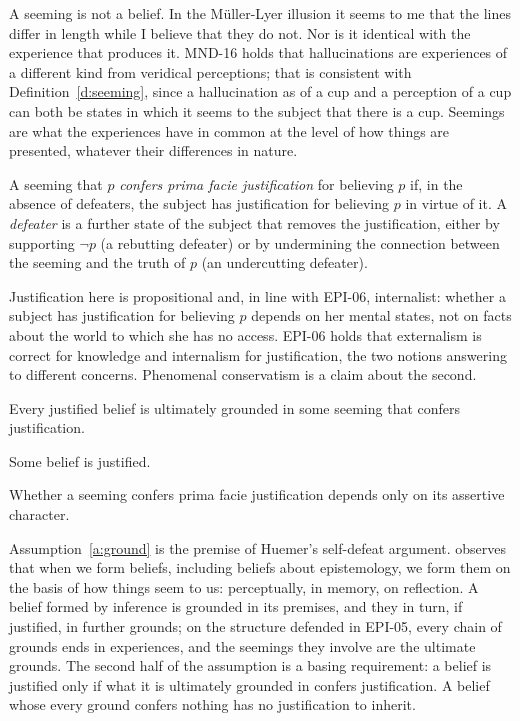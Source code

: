 \documentclass{situationist-preprint}
\begin{document}
A seeming is not a belief. In the Müller-Lyer illusion it seems to me that the lines differ in length while I believe that they do not. Nor is it identical with the experience that produces it. MND-16 holds that hallucinations are experiences of a different kind from veridical perceptions; that is consistent with Definition~\ref{d:seeming}, since a hallucination as of a cup and a perception of a cup can both be states in which it seems to the subject that there is a cup. Seemings are what the experiences have in common at the level of how things are presented, whatever their differences in nature.

\begin{definition}\label{d:pf}
A seeming that $p$ \emph{confers prima facie justification} for believing $p$ if, in the absence of defeaters, the subject has justification for believing $p$ in virtue of it. A \emph{defeater} is a further state of the subject that removes the justification, either by supporting $\neg p$ (a rebutting defeater) or by undermining the connection between the seeming and the truth of $p$ (an undercutting defeater).
\end{definition}

Justification here is propositional and, in line with EPI-06, internalist: whether a subject has justification for believing $p$ depends on her mental states, not on facts about the world to which she has no access. EPI-06 holds that externalism is correct for knowledge and internalism for justification, the two notions answering to different concerns. Phenomenal conservatism is a claim about the second.

\begin{assumption}[Grounding]\label{a:ground}
Every justified belief is ultimately grounded in some seeming that confers justification.
\end{assumption}

\begin{assumption}\label{a:nonscep}
Some belief is justified.
\end{assumption}

\begin{assumption}\label{a:char}
Whether a seeming confers prima facie justification depends only on its assertive character.
\end{assumption}

Assumption~\ref{a:ground} is the premise of Huemer's self-defeat argument. \citet{Huemer2007} observes that when we form beliefs, including beliefs about epistemology, we form them on the basis of how things seem to us: perceptually, in memory, on reflection. A belief formed by inference is grounded in its premises, and they in turn, if justified, in further grounds; on the structure defended in EPI-05, every chain of grounds ends in experiences, and the seemings they involve are the ultimate grounds. The second half of the assumption is a basing requirement: a belief is justified only if what it is ultimately grounded in confers justification. A belief whose every ground confers nothing has no justification to inherit.
\end{document}
